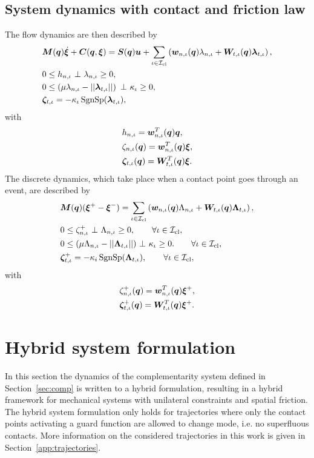 \documentclass[../DC2017114Bouma.tex]{subfiles}
\begin{document}
\subsection{System dynamics with contact and friction law}
The flow dynamics are then described by
\begin{align}
&\Mb(\qb)\dot{\xib} + \Cb(\qb,\xib) = \Sb(\qb)\ub + \sum_{\iota\in\Ic_{\text{cl}}}\left(\wb_{n,\iota}(\qb)\lambda_{n,\iota} + \Wb_{t,\iota}(\qb)\lambdab_{t,\iota} \right), \label{eq:ncpcontact1}\\
&0\leq h_{n,\iota}\ \bot\ \lambda_{n,\iota} \geq 0,\label{eq:ncpcontact2}\\
&0\leq \left(\mu\lambda_{n,\iota} - ||\lambdab_{t,\iota}||\right)\ \bot\ \kappa_{\iota} \geq 0,\label{eq:ncpcontact3}\\
&\zetab_{t,\iota} = -\kappa_{\iota}\SgnSp(\lambdab_{t,\iota}),\label{eq:ncpcontact4}
\end{align}
with 
\begin{align}
&h_{n,\iota} = {\boldsymbol{w}}_{n,\iota}^T({\boldsymbol{q}}){\boldsymbol{q}},\label{eq:h}\\
&\zeta_{n,\iota}({\boldsymbol{q}}) = {\boldsymbol{w}}^T_{n,\iota}({\boldsymbol{q}}) \boldsymbol{\xi},  \label{eq:zetan}\\
&\boldsymbol{\zeta}_{t,\iota}({\boldsymbol{q}}) = {\boldsymbol{W}}^T_{t,\iota}({\boldsymbol{q}}) \boldsymbol{\xi}. \label{eq:zetab}
\end{align}
The discrete dynamics, which take place when a contact point goes through an event, are described by
\begin{align}
&\Mb(\qb)(\xib^+ - \xib^-) = \sum_{\iota\in\Ic_{\text{cl}}}\left( \wb_{n,\iota}(\qb)\Lambda_{n,\iota} + \Wb_{t,\iota}(\qb)\Lambdab_{t,\iota}\right), \label{eq:ncpimpact1}\\
&0\leq \zeta_{n,\iota}^+\ \bot\ \Lambda_{n,\iota} \geq 0, \qquad \forall \iota\in\Ic_{\text{cl}},\label{eq:ncpimpact2}\\
&0 \leq (\mu\Lambda_{n,\iota} - ||\Lambdab_{t,\iota}||)\ \bot\ \kappa_{\iota} \geq 0. \qquad \forall \iota\in\Ic_{\text{cl}},\label{eq:ncpimpact3}\\
&\zetab_{t,\iota}^+ = -\kappa_i\SgnSp(\Lambdab_{t,\iota}),\qquad \forall \iota\in\Ic_{\text{cl}},\label{eq:ncpimpact4}
\end{align}
with 
\begin{align}
&\zeta^+_{n,\iota}({\boldsymbol{q}}) = {\boldsymbol{w}}^T_{n,\iota}({\boldsymbol{q}}) \boldsymbol{\xi}^+,\\
&\boldsymbol{\zeta}^+_{t,\iota}({\boldsymbol{q}}) = {\boldsymbol{W}}^T_{t,\iota}({\boldsymbol{q}}) \boldsymbol{\xi}^+.\label{eq:ncpimpactend}
\end{align}

\section{Hybrid system formulation}
In this section the dynamics of the complementarity system defined in Section~\ref{sec:comp} is written to a hybrid formulation, resulting in a hybrid framework for mechanical systems with unilateral constraints and spatial friction. The hybrid system formulation only holds for trajectories where only the contact points activating a guard function are allowed to change mode, i.e. no superfluous contacts. More information on the considered trajectories in this work is given in Section~\ref{app:trajectories}.
\end{document}
